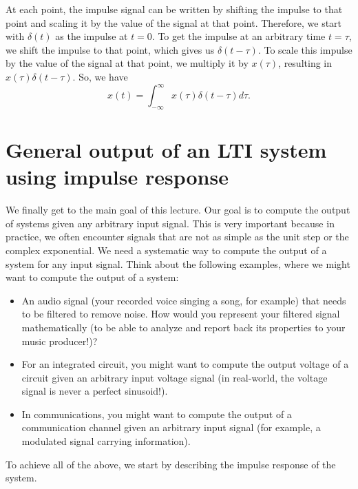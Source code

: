 At each point, the impulse signal can be written by shifting the impulse to that point and scaling it by the value of the signal at that point. Therefore, we start with $\delta(t)$ as the impulse at $t=0$. To get the impulse at an arbitrary time $t=\tau$, we shift the impulse to that point, which gives us $\delta(t - \tau)$. To scale this impulse by the value of the signal at that point, we multiply it by $x(\tau)$, resulting in $x(\tau) \delta(t - \tau)$. So, we have
\[
x(t) = \int_{-\infty}^{\infty} x(\tau) \delta(t - \tau) d\tau.
\]
\section{General output of an LTI system using impulse response}
We finally get to the main goal of this lecture. Our goal is to compute the output of systems given any arbitrary input signal. This is very important because in practice, we often encounter signals that are not as simple as the unit step or the complex exponential. We need a systematic way to compute the output of a system for any input signal. Think about the following examples, where we might want to compute the output of a system:
\begin{itemize}
    \item An audio signal (your recorded voice singing a song, for example) that needs to be filtered to remove noise. How would you represent your filtered signal mathematically (to be able to analyze and report back its properties to your music producer!)?
    \item For an integrated circuit, you might want to compute the output voltage of a circuit given an arbitrary input voltage signal (in real-world, the voltage signal is never a perfect sinusoid!).
    \item In communications, you might want to compute the output of a communication channel given an arbitrary input signal (for example, a modulated signal carrying information).
\end{itemize}
To achieve all of the above, we start by describing the impulse response of the system.

